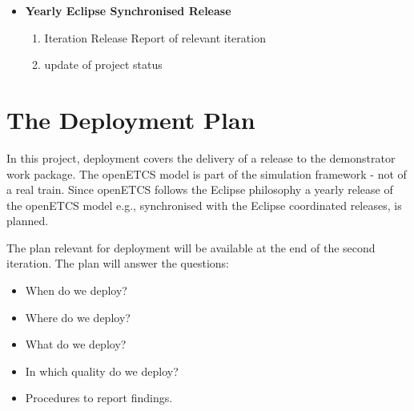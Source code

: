 \documentclass{template/openetcs_report}
\begin{document}
\begin{description}
\begin{itemize}
\item \textbf{Yearly Eclipse Synchronised Release}
\begin{enumerate}
\item Iteration Release Report of relevant iteration
\item update of project status
\end{enumerate}

\end{itemize}

\chapter{The Deployment Plan}

In this project, deployment covers the delivery of a release to the demonstrator work package. The openETCS model is part of the simulation framework - not of a real train. Since openETCS follows the Eclipse philosophy a yearly release of the openETCS model e.g., synchronised with the Eclipse coordinated releases, is planned. 

The plan relevant for deployment will be available at the end of the second iteration.
The plan will answer the questions:
\begin {itemize}
\item When do we deploy?
\item Where do we deploy?
\item What do we deploy?
\item In which quality do we deploy?
\item Procedures to report findings.
\end{itemize}
\end{description}






\nocite{*}
\end{document}
